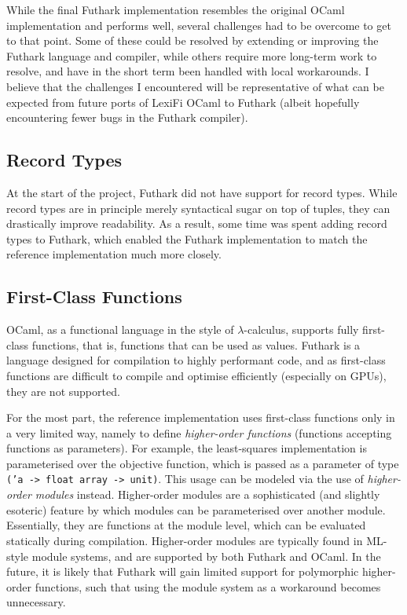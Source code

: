 \documentclass{article}
\begin{document}
While the final Futhark implementation resembles the original OCaml
implementation and performs well, several challenges had to be
overcome to get to that point.  Some of these could be resolved by
extending or improving the Futhark language and compiler, while others
require more long-term work to resolve, and have in the short term
been handled with local workarounds.  I believe that the challenges I
encountered will be representative of what can be expected from future
ports of LexiFi OCaml to Futhark (albeit hopefully encountering fewer
bugs in the Futhark compiler).

\subsection{Record Types}

At the start of the project, Futhark did not have support for record
types.  While record types are in principle merely syntactical sugar
on top of tuples, they can drastically improve readability.  As a
result, some time was spent adding record types to Futhark, which
enabled the Futhark implementation to match the reference
implementation much more closely.

\subsection{First-Class Functions}

OCaml, as a functional language in the style of $\lambda$-calculus,
supports fully first-class functions, that is, functions that can be
used as values.  Futhark is a language designed for compilation to
highly performant code, and as first-class functions are difficult to
compile and optimise efficiently (especially on GPUs), they are not
supported.

For the most part, the reference implementation uses first-class
functions only in a very limited way, namely to define
\textit{higher-order functions} (functions accepting functions as
parameters).  For example, the least-squares implementation is
parameterised over the objective function, which is passed as a
parameter of type \texttt{('a -> float array -> unit)}.  This usage
can be modeled via the use of \textit{higher-order modules} instead.
Higher-order modules are a sophisticated (and slightly esoteric)
feature by which modules can be parameterised over another module.
Essentially, they are functions at the module level, which can be
evaluated statically during compilation.  Higher-order modules are
typically found in ML-style module systems, and are supported by both
Futhark and OCaml.  In the future, it is likely that Futhark will gain
limited support for polymorphic higher-order functions, such that
using the module system as a workaround becomes unnecessary.
\end{document}
